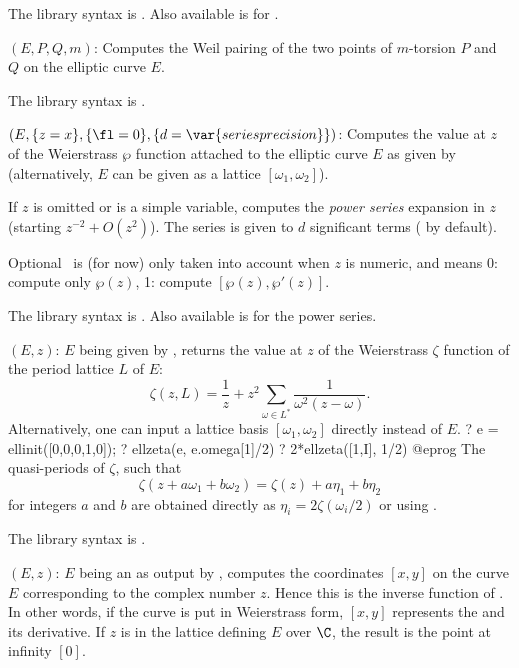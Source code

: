 The library syntax is .
Also available is  for .

$(E, P, Q, m)$: \label{se:ellweilpairing}Computes the Weil pairing of the two points of $m$-torsion $P$ and $Q$
on the elliptic curve $E$.

The library syntax is .

$(E,\{z=x\},\{\fl=0\},\{d=\var{seriesprecision}\})$: \label{se:ellwp}Computes the value at $z$ of the Weierstrass $\wp$ function attached to
the elliptic curve $E$ as given by  (alternatively, $E$ can be
given as a lattice $[\omega_1,\omega_2]$).

If $z$ is omitted or is a simple variable, computes the \emph{power series}
expansion in $z$ (starting $z^{-2}+O(z^2)$). The series is given to $d$
significant terms ( by default).

Optional \fl\ is (for now) only taken into account when $z$ is numeric, and
means 0: compute only $\wp(z)$, 1: compute $[\wp(z),\wp'(z)]$.

The library syntax is .
Also available is  for the power
series.

$(E,z)$: \label{se:ellzeta}
$E$ being given by , returns the
value at $z$ of the Weierstrass $\zeta$ function of the period lattice $L$
of $E$:
$$ \zeta(z, L) = \dfrac{1}{z} + z^2\sum_{\omega\in L^*}
\dfrac{1}{\omega^2(z-\omega)}.$$
Alternatively, one can input a lattice basis $[\omega_1,\omega_2]$ directly
instead of $E$.
\bprog
? e = ellinit([0,0,0,1,0]);
? ellzeta(e, e.omega[1]/2)
? 2*ellzeta([1,I], 1/2)
@eprog\noindent
The quasi-periods of $\zeta$, such that
$$\zeta(z + a\omega_1 + b\omega_2) = \zeta(z) + a\eta_1 + b\eta_2 $$
for integers $a$ and $b$ are obtained directly as $\eta_i =
2\zeta(\omega_i/2)$ or using .

The library syntax is .

$(E,z)$: \label{se:ellztopoint}
$E$ being an  as output by
, computes the coordinates $[x,y]$ on the curve $E$
corresponding to the complex number $z$. Hence this is the inverse function
of . In other words, if the curve is put in Weierstrass
form, $[x,y]$ represents the  and its
derivative. If $z$ is in the lattice defining $E$ over $\C$, the result is
the point at infinity $[0]$.

